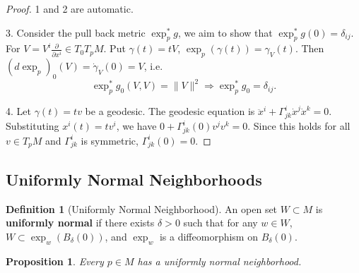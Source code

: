 \documentclass[11pt, a4paper]{article}
\theoremstyle{plain}
\newtheorem{proposition}[theorem]{Proposition}
\theoremstyle{definition}
\newtheorem{definition}[theorem]{Definition}
\theoremstyle{remark}
\begin{document}
\begin{proof}
1 and 2 are automatic.

3. Consider the pull back metric $\exp_p^* g$, we aim to show that $\exp_p^* g(0) = \delta_{ij}$. For $V = V^i\frac{\partial}{\partial x^i}\in T_0 T_p M$.
Put $\gamma(t) = tV$, $\exp_p(\gamma(t)) = \gamma_V(t)$. Then $(d\exp_p)_0(V) = \dot{\gamma}_V(0) = V$, i.e. 
\[\exp_p^*g_0(V,V) = \|V\|^2 \Longrightarrow \exp_p^*g_0 = \delta_{ij}.\]

4. Let $\gamma(t) = tv$ be a geodesic. The geodesic equation is $\ddot{x}^i + \Gamma_{jk}^i \dot{x}^j \dot{x}^k = 0$.
Substituting $x^i(t) = tv^i$, we have $0 + \Gamma_{jk}^i(0) v^j v^k = 0$. Since this holds for all $v \in T_pM$ and $\Gamma_{jk}^i$ is symmetric, $\Gamma_{jk}^i(0) = 0$.
\end{proof}

\subsection{Uniformly Normal Neighborhoods}

\begin{definition}[Uniformly Normal Neighborhood]
An open set $W \subset M$ is \textbf{uniformly normal} if there exists $\delta > 0$ such that for any $w \in W$, $W \subset \exp_w(B_\delta(0))$, and $\exp_w$ is a diffeomorphism on $B_\delta(0)$.
\end{definition}

\begin{proposition}
Every $p \in M$ has a uniformly normal neighborhood.
\end{proposition}
\end{document}
